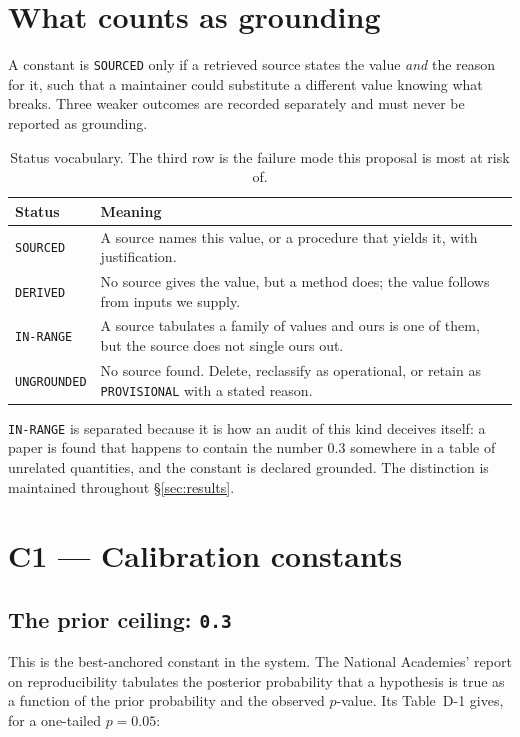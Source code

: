 \documentclass[11pt,letterpaper]{article}
\newcommand{\code}[1]{\texttt{#1}}
\begin{document}
\section{What counts as grounding}

A constant is \code{SOURCED} only if a retrieved source states the value
\emph{and} the reason for it, such that a maintainer could substitute a
different value knowing what breaks. Three weaker outcomes are recorded
separately and must never be reported as grounding.

\begin{table}[h]
\centering
\caption{Status vocabulary. The third row is the failure mode this proposal is
most at risk of.}
\label{tab:status}
\begin{tabular}{@{}p{}p{}@{}}
\toprule
\textbf{Status} & \textbf{Meaning} \\
\midrule
\code{SOURCED} & A source names this value, or a procedure that yields it,
with justification. \\
\code{DERIVED} & No source gives the value, but a method does; the value
follows from inputs we supply. \\
\code{IN-RANGE} & A source tabulates a family of values and ours is one of
them, but the source does not single ours out. \\
\code{UNGROUNDED} & No source found. Delete, reclassify as operational, or
retain as \code{PROVISIONAL} with a stated reason. \\
\bottomrule
\end{tabular}
\end{table}

\code{IN-RANGE} is separated because it is how an audit of this kind deceives
itself: a paper is found that happens to contain the number $0.3$ somewhere in
a table of unrelated quantities, and the constant is declared grounded. The
distinction is maintained throughout \S\ref{sec:results}.

\section{C1 --- Calibration constants}

\subsection{The prior ceiling: \code{0.3}}
\label{sec:prior}

This is the best-anchored constant in the system. The National Academies' report
on reproducibility \cite{nap2019} tabulates the posterior probability that a
hypothesis is true as a function of the prior probability and the observed
$p$-value. Its Table~D-1 gives, for a one-tailed $p = 0.05$:
\end{document}
